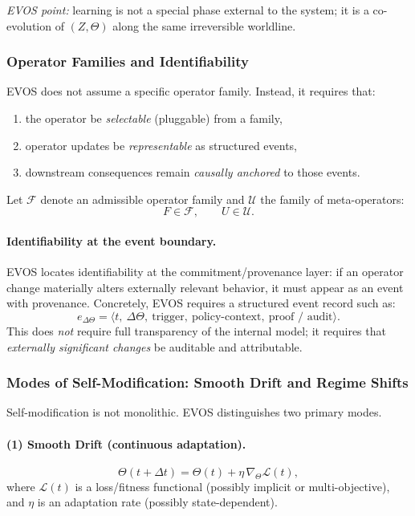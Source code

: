 \documentclass[11pt]{article}
\begin{document}
\emph{EVOS point:} learning is not a special phase external to the system; it is a
co-evolution of $(Z,\Theta)$ along the same irreversible worldline.

\subsubsection{Operator Families and Identifiability}
\label{sec:operator-families}

EVOS does not assume a specific operator family. Instead, it requires that:
\begin{enumerate}
  \item the operator be \emph{selectable} (pluggable) from a family,
  \item operator updates be \emph{representable} as structured events,
  \item downstream consequences remain \emph{causally anchored} to those events.
\end{enumerate}

Let $\mathcal{F}$ denote an admissible operator family and $\mathcal{U}$ the family of
meta-operators:
\[
F \in \mathcal{F}, \qquad U \in \mathcal{U}.
\]

\paragraph{Identifiability at the event boundary.}
EVOS locates identifiability at the commitment/provenance layer: if an operator change
materially alters externally relevant behavior, it must appear as an event with provenance.
Concretely, EVOS requires a structured event record such as:
\[
e_{\Delta\Theta} = \langle t,\ \Delta\Theta,\ \text{trigger},\ \text{policy-context},\ \text{proof / audit}\rangle.
\]
This does \emph{not} require full transparency of the internal model; it requires that
\emph{externally significant changes} be auditable and attributable.

\subsubsection{Modes of Self-Modification: Smooth Drift and Regime Shifts}
\label{sec:modes-selfmod}

Self-modification is not monolithic. EVOS distinguishes two primary modes.

\paragraph{(1) Smooth Drift (continuous adaptation).}
\[
\Theta(t+\Delta t) = \Theta(t) + \eta\, \nabla_{\Theta}\mathcal{L}(t),
\]
where $\mathcal{L}(t)$ is a loss/fitness functional (possibly implicit or multi-objective),
and $\eta$ is an adaptation rate (possibly state-dependent).
\end{document}
